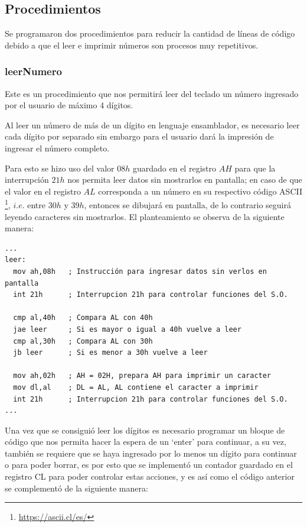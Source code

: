 \documentclass[letter,12 pt,titlepage]{article}
\begin{document}
    \subsection{Procedimientos}

    Se programaron dos procedimientos para reducir la cantidad de líneas de código debido a que el leer e imprimir números son procesos muy repetitivos.

    \subsubsection{leerNumero}
    Este es un procedimiento que nos permitirá leer del teclado un número ingresado por el usuario de máximo 4 dígitos.

    Al leer un número de más de un dígito en lenguaje ensamblador, es necesario leer cada dígito por separado sin embargo para el usuario dará la impresión de ingresar el número completo.

    Para esto se hizo uso del valor $08h$ guardado en el registro $AH$ para que la interrupción $21h$ nos permita leer datos sin mostrarlos en pantalla; en caso de  que el valor en el registro $AL$ corresponda a un número en su respectivo código ASCII \footnote{\url{https://ascii.cl/es/}}, $i.e.$ entre $30h$ y $39h$, entonces se dibujará en pantalla, de lo contrario seguirá leyendo caracteres sin mostrarlos. El planteamiento se observa de la siguiente manera:

    \begin{verbatim}
...
leer:
  mov ah,08h   ; Instrucción para ingresar datos sin verlos en pantalla
  int 21h      ; Interrupcion 21h para controlar funciones del S.O.

  cmp al,40h   ; Compara AL con 40h
  jae leer     ; Si es mayor o igual a 40h vuelve a leer
  cmp al,30h   ; Compara AL con 30h
  jb leer      ; Si es menor a 30h vuelve a leer

  mov ah,02h   ; AH = 02H, prepara AH para imprimir un caracter
  mov dl,al    ; DL = AL, AL contiene el caracter a imprimir
  int 21h      ; Interrupcion 21h para controlar funciones del S.O.
...
    \end{verbatim}
    
    Una vez que se consiguió leer los dígitos es necesario programar un bloque de código que nos permita hacer la espera de un `enter' para continuar, a su vez, también se requiere que se haya ingresado por lo menos un dígito para continuar o para poder borrar, es por esto que se implementó un contador guardado en el registro CL para poder controlar estas acciones, y es así como el código anterior se complementó de la siguiente manera:
\end{document}
